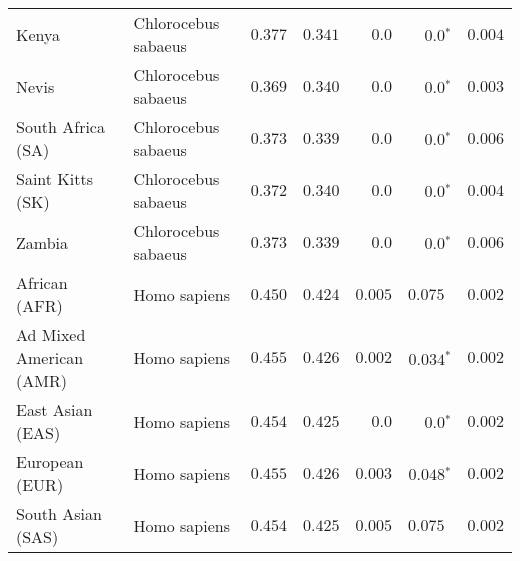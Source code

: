 \begin{center}
\begin{adjustbox}{width = 1\textwidth}
\begin{tabular}{|l|l|r|r|r|r|r|}
            Kenya              & Chlorocebus sabaeus & $ 0.377$ & $ 0.341$ & $0.0$    & $\bm{0.0{^*}}$    & $ 0.004$ \\
            Nevis               & Chlorocebus sabaeus & $ 0.369$ & $ 0.340$ & $0.0$    & $\bm{0.0{^*}}$    & $ 0.003$ \\
            South Africa (SA)                         & Chlorocebus sabaeus & $ 0.373$ & $ 0.339$ & $0.0$    & $\bm{0.0{^*}}$    & $ 0.006$ \\
            Saint Kitts (SK)                  & Chlorocebus sabaeus        & $ 0.372$ & $ 0.340$ & $0.0$ & $\bm{0.0{^*}}$        & $ 0.004$ \\
            Zambia        & Chlorocebus sabaeus        & $ 0.373$ & $ 0.339$ & $0.0$ & $\bm{0.0{^*}}$ & $ 0.006$ \\
            African (AFR)               & Homo sapiens        & $ 0.450$ & $ 0.424$ & $ 0.005$    & $ 0.075~~$    & $ 0.002$ \\
            Ad Mixed American (AMR)                 & Homo sapiens        & $ 0.455$ & $ 0.426$ & $ 0.002$ & $\bm{ 0.034{^*}}$ & $ 0.002$ \\
            East Asian (EAS)              & Homo sapiens        & $ 0.454$ & $ 0.425$ & $0.0$ & $\bm{0.0{^*}}$        & $ 0.002$ \\
            European (EUR)              & Homo sapiens        & $ 0.455$ & $ 0.426$ & $ 0.003$ & $\bm{ 0.048{^*}}$        & $ 0.002$ \\
            South Asian (SAS)              & Homo sapiens        & $ 0.454$ & $ 0.425$ & $ 0.005$ & $ 0.075~~$        & $ 0.002$ \\
            \bottomrule
        \end{tabular}
    \end{adjustbox}
    \newpage
\end{center}

